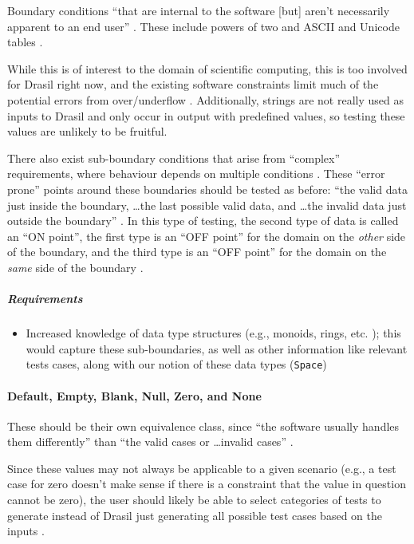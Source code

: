 Boundary conditions ``that are internal to the software [but] aren't necessarily
apparent to an end user'' \citep[p.~75]{Patton2006}. These include
powers of two \citep[pp.~75-76]{Patton2006} and ASCII and Unicode tables
\citep[pp.~76-77]{Patton2006}.

While this is of interest to the domain of scientific computing, this is too
involved for Drasil right now, and the existing software constraints limit much
of the potential errors from over/underflow \citep{june_11_meeting}. Additionally,
strings are not really used as inputs to Drasil and only occur in output with
predefined values, so testing these values are unlikely to be fruitful.

There also exist sub-boundary conditions that arise from ``complex''
requirements, where behaviour depends on multiple conditions
\citep[p.~430]{vanVliet2000}. These ``error prone'' points around
these boundaries should be tested \citep[p.~430]{vanVliet2000} as
before: ``the valid data just inside the boundary, \dots the last possible
valid data, and \dots the invalid data just outside the boundary''
\citep[p.~73]{Patton2006}. In this type of testing, the second type of
data is called an ``ON point'', the first type is an ``OFF point'' for the
domain on the \emph{other} side of the boundary, and the third type is an ``OFF
point'' for the domain on the \emph{same} side of the boundary
\citep[p.~430]{vanVliet2000}.

\subparagraph{Requirements}
\begin{itemize}
      \item Increased knowledge of data type structures (e.g., monoids, rings,
            etc. \citep{june_11_meeting}); this would capture these sub-boundaries,
            as well as other information like relevant tests cases, along with
            our notion of these data types (\texttt{Space})
\end{itemize}

\paragraph{Default, Empty, Blank, Null, Zero, and None
      \citep[pp.~77-78]{Patton2006}}

These should be their own equivalence class, since ``the software usually
handles them differently'' than ``the valid cases or \dots invalid cases''
\citep[p.~78]{Patton2006}.

Since these values may not always be applicable to a given scenario (e.g., a
test case for zero doesn't make sense if there is a constraint that the value
in question cannot be zero), the user should likely be able to select
categories of tests to generate instead of Drasil just generating all possible
test cases based on the inputs \citep{june_11_meeting}.

